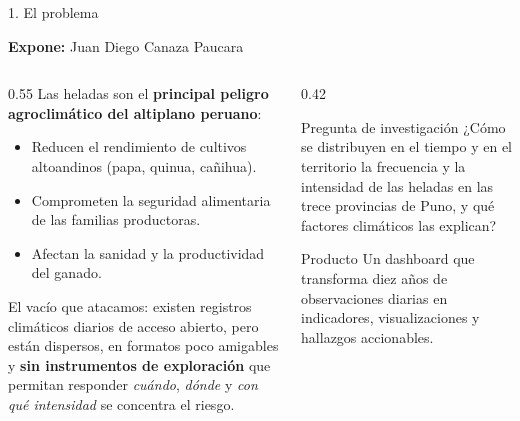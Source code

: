 \documentclass[aspectratio=169,11pt]{beamer}
\newcommand{\ponente}[1]{%
  \begin{flushright}\tiny\textcolor{pnBrandDark}{\textbf{Expone:} #1}\end{flushright}%
  \vspace{-0.9em}%
}
\begin{document}
\begin{frame}{1. El problema}
  \ponente{Juan Diego Canaza Paucara}
  \small
  \begin{columns}[T]
    \begin{column}{0.55\textwidth}
      Las heladas son el \textbf{principal peligro agroclimático del altiplano peruano}:
      \begin{itemize}\itemsep0.3em
        \item Reducen el rendimiento de cultivos altoandinos (papa, quinua, cañihua).
        \item Comprometen la seguridad alimentaria de las familias productoras.
        \item Afectan la sanidad y la productividad del ganado.
      \end{itemize}

      \vspace{0.6em}
      \alert{El vacío que atacamos:} existen registros climáticos diarios de acceso abierto, pero
      están dispersos, en formatos poco amigables y \textbf{sin instrumentos de exploración} que
      permitan responder \emph{cuándo}, \emph{dónde} y \emph{con qué intensidad} se concentra el riesgo.
    \end{column}
    \begin{column}{0.42\textwidth}
      \begin{block}{Pregunta de investigación}
        \small ¿Cómo se distribuyen en el tiempo y en el territorio la frecuencia y la intensidad de
        las heladas en las trece provincias de Puno, y qué factores climáticos las explican?
      \end{block}
      \vspace{0.3em}
      \begin{block}{Producto}
        \small Un dashboard que transforma diez años de observaciones diarias en indicadores,
        visualizaciones y hallazgos accionables.
      \end{block}
    \end{column}
  \end{columns}
\end{frame}
\end{document}
